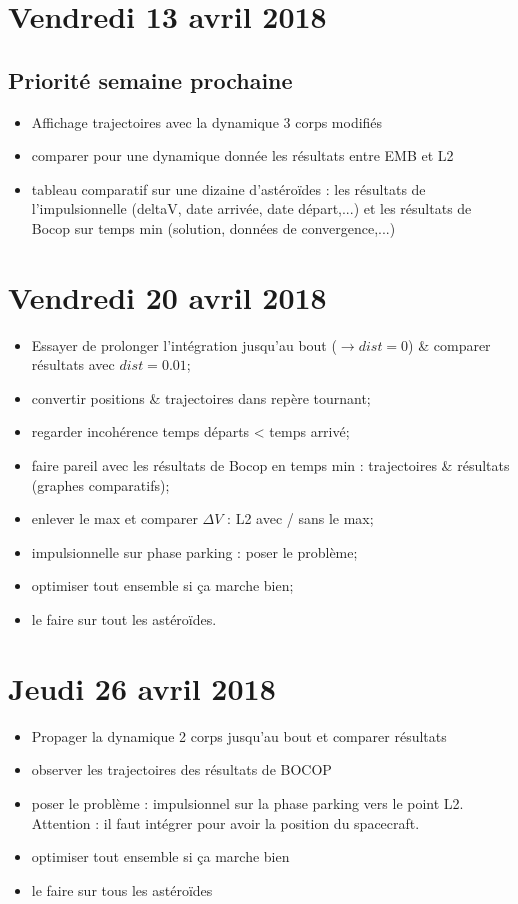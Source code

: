\documentclass[fleqn,%
a4paper,11pt]{scrbook}
\begin{document}
\newpage
\section*{Vendredi 13 avril 2018}
\subsection*{Priorité semaine prochaine}
\begin{itemize}
	\item Affichage trajectoires avec la dynamique 3 corps modifiés
	\item comparer pour une dynamique donnée les résultats entre EMB et L2
	\item tableau comparatif sur une dizaine d'astéroïdes : les résultats de l'impulsionnelle (deltaV, date arrivée, date départ,...)  et les résultats de Bocop  sur temps min (solution, données de convergence,...)
\end{itemize}

\section*{Vendredi 20 avril 2018}
\begin{itemize}
	\item Essayer de prolonger l'intégration jusqu'au bout ($\rightarrow dist = 0$) \& comparer résultats avec $dist = 0.01$;
	\item convertir positions \& trajectoires dans repère tournant;
	\item regarder incohérence temps départs < temps arrivé;
	\item faire pareil avec les résultats de Bocop en temps min : trajectoires \& résultats (graphes comparatifs);
	\item enlever le max et comparer $\Delta V$ : L2 avec / sans le max;
	\item impulsionnelle sur phase parking : poser le problème;
	\item optimiser tout ensemble si ça marche bien;
	\item le faire sur tout les astéroïdes.
\end{itemize}

\section*{Jeudi 26 avril 2018}
\begin{itemize}
	\item Propager la dynamique 2 corps jusqu'au bout et comparer résultats
	\item observer les trajectoires des résultats de BOCOP
	\item poser le problème : impulsionnel sur la phase parking vers le point L2. Attention : il faut intégrer pour avoir la position du spacecraft.
	\item optimiser tout ensemble si ça marche bien
	\item le faire sur tous les astéroïdes
\end{itemize}
\end{document}

